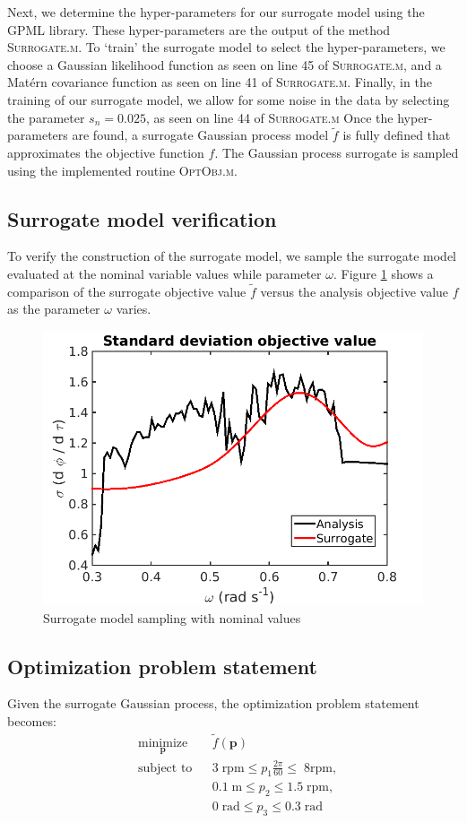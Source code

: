 \documentclass[11pt]{article}
\newcommand{\bs}[1] {\boldsymbol{#1}}
\begin{document}
Next, we determine the hyper-parameters for our surrogate
model using the \textsc{GPML} library. These hyper-parameters
are the output of the method \textsc{Surrogate.m}. To `train'
the surrogate model to select the hyper-parameters, we
choose a Gaussian likelihood function as seen on line
45 of \textsc{Surrogate.m}, and a Mat\'{e}rn covariance
function as seen on line 41 of \textsc{Surrogate.m}.
Finally, in the training of our surrogate model, we allow
for some noise in the data by selecting the parameter
$s_n = 0.025$, as seen on line 44 of \textsc{Surrogate.m}
Once the hyper-parameters are found, a surrogate Gaussian
process model $\tilde{f}$ is fully defined that
approximates the objective function $f$. The Gaussian
process surrogate is sampled using the implemented
routine \textsc{OptObj.m}.

\subsection{Surrogate model verification}

To verify the construction of the surrogate model,
we sample the surrogate model evaluated at the nominal
variable values while parameter $\omega$. Figure
\ref{fig:surrogate} shows a comparison of the surrogate
objective value $\tilde{f}$ versus the analysis objective
value $f$ as the parameter $\omega$ varies.

\begin{figure}[hbt!]
\centering
\includegraphics[width=.5\linewidth]{Verify2}
\caption{Surrogate model sampling with nominal values}
\label{fig:surrogate}
\end{figure}

\subsection{Optimization problem statement}

Given the surrogate Gaussian process, the optimization
problem statement becomes:
\begin{equation}
\begin{aligned}
& \underset{\bs{p}}{\text{minimize}}
& & \tilde{f}(\bs{p}) \\
& \text{subject to}
& & 3 \; \text{rpm} \leq p_1 \frac{2 \pi}{60} \leq \; 8 \text{rpm}, \\
&&& 0.1 \; \text{m} \leq p_2 \leq 1.5 \; \text{rpm}, \\
&&& 0 \; \text{rad} \leq p_3 \leq 0.3 \; \text{rad}\\
\end{aligned}
\end{equation}
\end{document}
